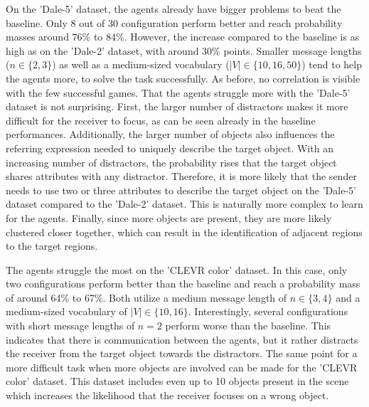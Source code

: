 \documentclass[11pt,a4paper]{article}
\begin{document}
On the 'Dale-5' dataset, the agents already have bigger problems to beat the baseline.
Only 8 out of 30 configuration perform better and reach probability masses around 76\% to 84\%.
However, the increase compared to the baseline is as high as on the 'Dale-2' dataset, with around 30\% points.
Smaller message lengths ($n \in \{2,3\}$) as well as a medium-sized vocabulary ($|V| \in \{10,16,50\}$) tend to help the agents more, to solve the task successfully.
As before, no correlation is visible with the few successful games.
That the agents struggle more with the 'Dale-5' dataset is not surprising.
First, the larger number of distractors makes it more difficult for the receiver to focus, as can be seen already in the baseline performances.
Additionally, the larger number of objects also influences the referring expression needed to uniquely describe the target object.
With an increasing number of distractors, the probability rises that the target object shares attributes with any distractor.
Therefore, it is more likely that the sender needs to use two or three attributes to describe the target object on the 'Dale-5' dataset compared to the 'Dale-2' dataset.
This is naturally more complex to learn for the agents. %
Finally, since more objects are present, they are more likely clustered closer together, which can result in the identification of adjacent regions to the target regions.

The agents struggle the most on the 'CLEVR color' dataset.
In this case, only two configurations perform better than the baseline and reach a probability mass of around 64\% to 67\%.
Both utilize a medium message length of $n \in \{3,4\}$ and a medium-sized vocabulary of $|V| \in \{10,16\}$.
Interestingly, several configurations with short message lengths of $n=2$ perform worse than the baseline.
This indicates that there is communication between the agents, but it rather distracts the receiver from the target object towards the distractors.
The same point for a more difficult task when more objects are involved can be made for the 'CLEVR color' dataset.
This dataset includes even up to 10 objects present in the scene which increases the likelihood that the receiver focuses on a wrong object.
\end{document}
